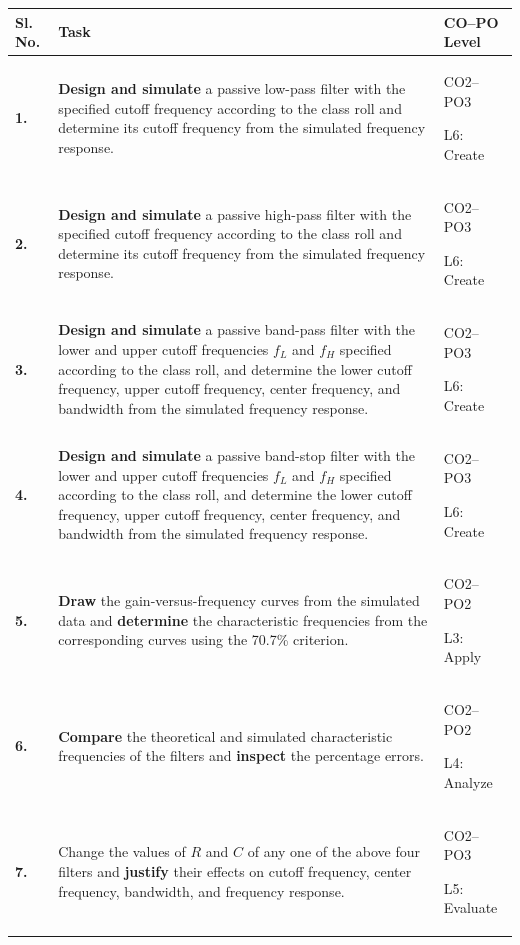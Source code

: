 \documentclass[12pt,a4paper]{article}
\begin{document}
\begingroup
{}
\setlength{\tabcolsep}{5pt}
\renewcommand{\arraystretch}{1.12}
\begin{tabularx}{\textwidth}{|>{\centering\arraybackslash}p{0.42in}|X|>{\centering\arraybackslash}p{0.82in}|}
\hline
\textbf{Sl. No.} & \centering\arraybackslash\textbf{Task} & \textbf{CO--PO Level} \\
\hline
\textbf{1.} &
\textbf{Design and simulate} a passive low-pass filter with the specified cutoff frequency according to the class roll and determine its cutoff frequency from the simulated frequency response. &
CO2--PO3\par L6: Create \\
\hline
\textbf{2.} &
\textbf{Design and simulate} a passive high-pass filter with the specified cutoff frequency according to the class roll and determine its cutoff frequency from the simulated frequency response. &
CO2--PO3\par L6: Create \\
\hline
\textbf{3.} &
\textbf{Design and simulate} a passive band-pass filter with the lower and upper cutoff frequencies $f_L$ and $f_H$ specified according to the class roll, and determine the lower cutoff frequency, upper cutoff frequency, center frequency, and bandwidth from the simulated frequency response. &
CO2--PO3\par L6: Create \\
\hline
\textbf{4.} &
\textbf{Design and simulate} a passive band-stop filter with the lower and upper cutoff frequencies $f_L$ and $f_H$ specified according to the class roll, and determine the lower cutoff frequency, upper cutoff frequency, center frequency, and bandwidth from the simulated frequency response. &
CO2--PO3\par L6: Create \\
\hline
\textbf{5.} &
\textbf{Draw} the gain-versus-frequency curves from the simulated data and \textbf{determine} the characteristic frequencies from the corresponding curves using the 70.7\% criterion. &
CO2--PO2\par L3: Apply \\
\hline
\textbf{6.} &
\textbf{Compare} the theoretical and simulated characteristic frequencies of the filters and \textbf{inspect} the percentage errors. &
CO2--PO2\par L4: Analyze \\
\hline
\textbf{7.} &
Change the values of $R$ and $C$ of any one of the above four filters and \textbf{justify} their effects on cutoff frequency, center frequency, bandwidth, and frequency response. &
CO2--PO3\par L5: Evaluate \\
\hline
\end{tabularx}
\endgroup
\end{document}
